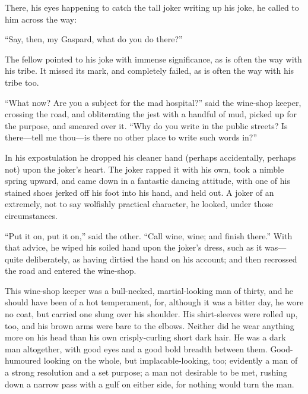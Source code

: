 There, his eyes happening to catch the tall joker writing up his
joke, he called to him across the way:

``Say, then, my Gaspard, what do you do there?''

The fellow pointed to his joke with immense significance, as is often
the way with his tribe.  It missed its mark, and completely failed,
as is often the way with his tribe too.

``What now?  Are you a subject for the mad hospital?'' said the
wine-shop keeper, crossing the road, and obliterating the jest with
a handful of mud, picked up for the purpose, and smeared over it.
``Why do you write in the public streets?  Is there---tell me thou---is
there no other place to write such words in?''

In his expostulation he dropped his cleaner hand (perhaps accidentally,
perhaps not) upon the joker's heart.  The joker rapped it with his
own, took a nimble spring upward, and came down in a fantastic
dancing attitude, with one of his stained shoes jerked off his foot
into his hand, and held out.  A joker of an extremely, not to say
wolfishly practical character, he looked, under those circumstances.

``Put it on, put it on,'' said the other.  ``Call wine, wine; and finish
there.''  With that advice, he wiped his soiled hand upon the joker's
dress, such as it was---quite deliberately, as having dirtied the hand
on his account; and then recrossed the road and entered the wine-shop.

This wine-shop keeper was a bull-necked, martial-looking man of
thirty, and he should have been of a hot temperament, for, although
it was a bitter day, he wore no coat, but carried one slung over his
shoulder.  His shirt-sleeves were rolled up, too, and his brown arms
were bare to the elbows.  Neither did he wear anything more on his
head than his own crisply-curling short dark hair.  He was a dark man
altogether, with good eyes and a good bold breadth between them.
Good-humoured looking on the whole, but implacable-looking, too;
evidently a man of a strong resolution and a set purpose; a man not
desirable to be met, rushing down a narrow pass with a gulf on either
side, for nothing would turn the man.

